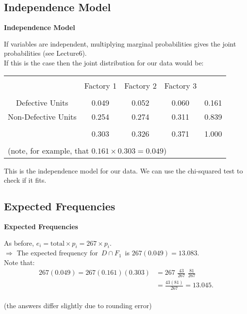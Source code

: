 \documentclass[compress]{beamer}        %
\makeatletter
\newcommand{\tcb}{\textcolor{beamer@blendedblue}}
\makeatother
\begin{document}
\subsection{Independence Model}
\begin{frame}{\bf \tcb{Independence Model}}\label{indep}

If variables are independent, multiplying marginal probabilities gives the joint probabilities (see Lecture6).\\[0.6cm]

If this is the case then the joint distribution for our data would be:\\[0.1cm]
\begin{center}
\begin{tabular}{|c|ccc|c|}
\hline
&&&&\\[-0.3cm]
                    & Factory 1 & Factory 2 & Factory 3 &  \\[0.1cm]
\hline
&&&&\\[-0.3cm]
Defective Units     &  0.049        &  0.052       &  0.060       & 0.161 \\[0.2cm]
Non-Defective Units &  0.254        &  0.274       &  0.311       & 0.839 \\[0.1cm]
\hline
&&&&\\[-0.3cm]
                    &  0.303       &  0.326       &  0.371       & 1.000 \\[0.1cm]
\hline
\multicolumn{5}{c}{}\\[-0.4cm]
\multicolumn{5}{l}{{\footnotesize(note, for example, that $0.161\times0.303 = 0.049$)}}
\end{tabular}
\end{center}


This is the independence model for our data. We can use the chi-squared test to check if it fits.

\end{frame}



\subsection{Expected Frequencies}
\begin{frame}{\bf \tcb{Expected Frequencies}}

As before, $e_i = \text{total} \times p_i = 267 \times p_i$.\\[0.7cm]

$\Rightarrow$ The expected frequency for \,$D \cap F_1$\, is $267(0.049) = 13.083$.\\[0.7cm]

Note that:
\begin{align*}
267(0.049) = 267(0.161)(0.303) &= 267 \,\, \frac{43}{267} \,\, \frac{81}{267} \\[0.2cm]
&= \frac{43(81)}{267} = 13.045.\\
\end{align*}

{\footnotesize(the answers differ slightly due to rounding error)}

\end{frame}
\end{document}
